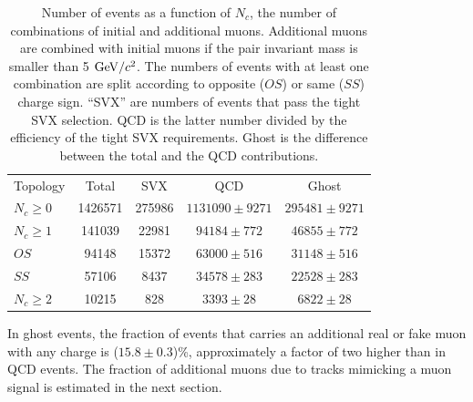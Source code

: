 \documentclass[aps,prd,preprint,floatfix,nofootinbib,superscriptaddress,showpacs,amssymb]{revtex4}
\begin{document}
 \begin{table}
 \caption[]{Number of events as a function of $N_c$, the number of
            combinations of initial and additional muons. Additional muons
            are combined with initial muons if the pair invariant mass is
            smaller than 5 ${\rm GeV/}c^2$. The numbers of events with at least one 
            combination are split according to opposite ($OS$) or same ($SS$) 
            charge sign. ``SVX'' are numbers of events that pass the tight
            SVX  selection. QCD is the latter number divided by the 
            efficiency of the tight SVX requirements. Ghost is the
            difference between the total  and the QCD contributions.}
 \begin{center}
 \begin{ruledtabular}
 \begin{tabular}{lcccc}
  Topology     &  Total      &  SVX   &     QCD            &   Ghost    \\
 $N_c \geq 0$  &  1426571  & 275986 & $1131090 \pm 9271$ & $295481 \pm 9271$\\ 
 $N_c \geq 1$  &  141039   &  22981 &   $94184 \pm  772$ & $ 46855 \pm 772$ \\
 $OS$          &   94148   &  15372 &   $63000 \pm  516$ & $ 31148 \pm 516$ \\
 $SS$          &   57106   &   8437 &   $34578 \pm  283$ & $ 22528 \pm 283$ \\
 $N_c \geq 2$  &   10215   &    828 &    $3393 \pm   28$ & $ 6822  \pm 28$  \\
 \end{tabular}
 \end{ruledtabular}
 \end{center}
 \label{tab:tab_3}
 \end{table}
 In ghost events, the fraction of events that carries an
 additional real or fake muon with any charge is ($15.8 \pm 0.3$)\%, 
 approximately a factor of two higher than in QCD events. The fraction 
 of additional muons due to tracks mimicking a muon signal is estimated
 in the next section. 
\end{document}
